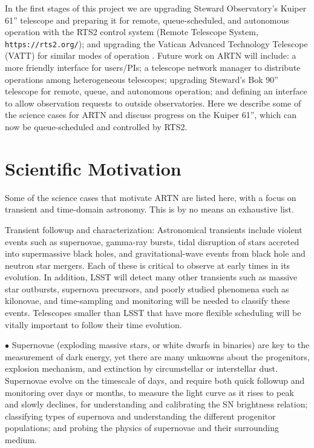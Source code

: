 \documentclass[]{spie}  %
\begin{document}
In the first stages of this project we are upgrading Steward Observatory's Kuiper 61'' telescope and preparing it for remote, queue-scheduled, and autonomous operation with the RTS2 control system\cite{Kubanek08, Kubanek16} (Remote Telescope System, {\tt https://rts2.org/}); and upgrading the Vatican Advanced Technology Telescope (VATT) for similar modes of operation \cite{Swindell17}.  Future work on ARTN will include: a more friendly interface for users/PIs;  a telescope network manager to distribute operations among heterogeneous telescopes; upgrading Steward's Bok 90'' telescope for remote, queue, and autonomous operation; and defining an interface to allow observation requests to outside observatories. Here we describe some of the science cases for ARTN and discuss progress on the Kuiper 61'', which can now be queue-scheduled and controlled by RTS2.



\section{Scientific Motivation}

Some of the science cases that motivate ARTN are listed here, with a focus on transient and time-domain astronomy. This is by no means an exhaustive list.

Transient followup and characterization: Astronomical transients include violent events such as supernovae, gamma-ray bursts, tidal disruption of stars accreted into supermassive black holes, and gravitational-wave events from black hole and neutron star mergers.  Each of these is critical to observe at early times in its evolution. In addition, LSST will detect many other transients such as massive star outbursts, supernova precursors, and poorly studied phenomena such as kilonovae, and time-sampling and monitoring will be needed to classify these events. Telescopes smaller than LSST that have more flexible scheduling will be vitally important to follow their time evolution.

$\bullet$ Supernovae (exploding massive stars, or white dwarfs in binaries) are key to the measurement of dark energy, yet there are many unknowns about the progenitors, explosion mechanism, and extinction by circumstellar or interstellar dust. Supernovae evolve on the timescale of days, and require both quick followup and monitoring over days or months, to measure the light curve as it rises to peak and slowly declines, for understanding and calibrating the SN brightness relation; classifying types of supernova and understanding the different progenitor populations; and probing the physics of supernovae and their surrounding medium.  
\end{document}
